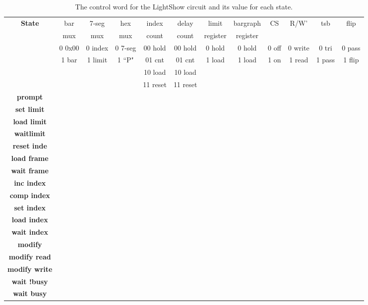 \documentclass{article}[10 pt,landscape]
\begin{document}
\begin{landscape}
\begin{table}
{\small
\begin{tabular}{c||c|c|c|c|c|c|c|c|c|c|c}
{\bf State } 	& bar & 7-seg & hex & index & delay & limit    & bargraph & CS & R/W' & tsb & flip \\  
    & mux & mux   & mux & count & count & register & register &       &       & &      \\  \hline \hline
    & 0 0x00 & 0 index & 0 7-seg & 00 hold & 00 hold & 0 hold & 0 hold & 0 off & 0 write & 0 tri & 0 pass \\ 
    & 1 bar	& 1 limit & 1 ``P"& 01 cnt & 01 cnt & 1 load &    1 load & 1 on    &  1 read & 1 pass & 1 flip \\
    & 	&     &     & 10 load & 10 load & & & & & \\
    & 	&     &	    & 11 reset	& 11 reset & & & & \\ \hline \hline
{\bf prompt } 	 & 	  &	  &	  &	   &	   &	  &	  &	  &   &	  &   \\ \hline
{\bf set limit }  & 	  &	  &	  &	   &	   &	  &	  &	  &   &	  &   \\ \hline
{\bf load limit } &	  &	  &	  &	   &	   &	  &	  &	  &   &	  &   \\ \hline
{\bf waitlimit } &	  &	  &	  &	   &	   &	  &	  &	  &   &	  &   \\ \hline
{\bf reset inde  } &	  &	  & 	  &	   &	   &	  &	  &	  &   &	  &   \\ \hline
{\bf load frame } &	  &	  &	  &	   &	   &	  &	  &	  &   &   &   \\ \hline
{\bf wait frame } &	  &	  &	  &	   &	   &	  &	  &	  &   &	  &   \\ \hline
{\bf inc index } &	  &	  &	  &	   &	   &	  &	  &	  &   &	  &   \\ \hline
{\bf comp index } &	  &	  &	  &	   &	   &	  &	  &	  &   &	  &   \\ \hline
{\bf set index } &	  &	  &	  &	   & 	   &	  & 	  &	  &   &	  &   \\ \hline
{\bf load index } &	  &	  & 	  &	   &	   &	  &	  &	  &   &   &   \\ \hline
{\bf wait index } &	  &	  &	  &	   &	   &	  &	  &	  &   &	  &   \\ \hline
{\bf modify	} &	  &	  &	  &	   &	   &	  &	  &	  &   &	  &   \\ \hline
{\bf modify read} &	  &	  &	  &	   &	   &	  &	  &	  &   &	  &   \\ \hline
{\bf modify write } &	  &	  &	  &	   &	   &	  &	  & 	  &   &	  &   \\ \hline
{\bf wait !busy } &	  &	  &	  &	   &	   &	  &	  &	  &   &	  &   \\ \hline
{\bf wait busy } &	  &	  &	  &	   &	   &	  &	  &	  &   &	  &   \\ 
\end{tabular} 
}
\caption{The control word for the LightShow circuit and its value for each state.}
\label{table:LightShow}
\end{table}

\end{landscape}
\end{document}
